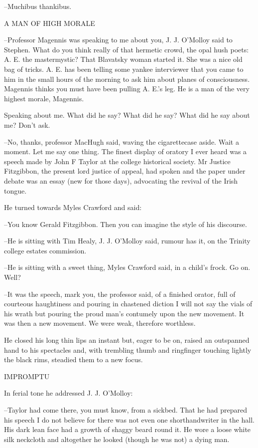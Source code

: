 --Muchibus thankibus.


    A MAN OF HIGH MORALE


--Professor Magennis was speaking to me about you, J. J. O'Molloy said to
Stephen. What do you think really of that hermetic crowd, the opal hush
poets: A. E. the mastermystic? That Blavatsky woman started it. She was a
nice old bag of tricks. A. E. has been telling some yankee interviewer
that you came to him in the small hours of the morning to ask him about
planes of consciousness. Magennis thinks you must have been pulling
A. E.'s leg. He is a man of the very highest morale, Magennis.

Speaking about me. What did he say? What did he say? What did he
say about me? Don't ask.

--No, thanks, professor MacHugh said, waving the cigarettecase aside.
Wait a moment. Let me say one thing. The finest display of oratory I ever
heard was a speech made by John F Taylor at the college historical
society. Mr Justice Fitzgibbon, the present lord justice of appeal, had
spoken and the paper under debate was an essay (new for those days),
advocating the revival of the Irish tongue.

He turned towards Myles Crawford and said:

--You know Gerald Fitzgibbon. Then you can imagine the style of his
discourse.

--He is sitting with Tim Healy, J. J. O'Molloy said, rumour has it, on
the Trinity college estates commission.

--He is sitting with a sweet thing, Myles Crawford said, in a child's
frock. Go on. Well?

--It was the speech, mark you, the professor said, of a finished orator,
full of courteous haughtiness and pouring in chastened diction I will not
say the vials of his wrath but pouring the proud man's contumely upon the
new movement. It was then a new movement. We were weak, therefore
worthless.

He closed his long thin lips an instant but, eager to be on, raised an
outspanned hand to his spectacles and, with trembling thumb and
ringfinger touching lightly the black rims, steadied them to a new focus.


    IMPROMPTU


In ferial tone he addressed J. J. O'Molloy:

--Taylor had come there, you must know, from a sickbed. That he had
prepared his speech I do not believe for there was not even one
shorthandwriter in the hall. His dark lean face had a growth of shaggy
beard round it. He wore a loose white silk neckcloth and altogether he
looked (though he was not) a dying man.

